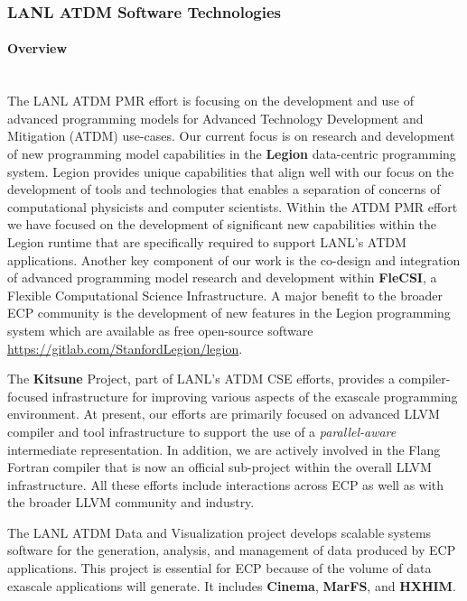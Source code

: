 \subsubsection{ LANL ATDM Software Technologies}

\paragraph{Overview} \leavevmode \\

The LANL ATDM PMR effort is focusing on the development and use of
advanced programming models for Advanced Technology Development and
Mitigation (ATDM) use-cases. Our current focus is on research and development
of new programming model capabilities in the \textbf{Legion} data-centric
programming system. Legion provides unique capabilities that align
well with our focus on the development of tools and technologies that
enables a separation of concerns of computational physicists and
computer scientists. Within the ATDM PMR effort we have focused on the
development of significant new capabilities within the Legion runtime
that are specifically required to support LANL's ATDM
applications. Another key component of our work is the co-design and
integration of advanced programming model research and development
within \textbf{FleCSI}, a Flexible Computational Science Infrastructure. A
major benefit to the broader ECP community is the development of new 
features in the Legion programming system which are available as free
open-source software \url{https://gitlab.com/StanfordLegion/legion}.  

The \textbf{Kitsune} Project, part of LANL's ATDM CSE efforts, provides a
compiler-focused infrastructure for improving various aspects of the
exascale programming environment.  At present, our efforts are primarily
focused on advanced LLVM compiler and tool infrastructure to support the
use of a \emph{parallel-aware} intermediate representation.  In
addition, we are actively involved in the Flang Fortran compiler that
is now an official sub-project within the overall LLVM infrastructure.
All these efforts include interactions across ECP as well as
with the broader LLVM community and industry.  

The LANL ATDM Data and Visualization project develops scalable
systems software for the generation, analysis, and management of data
produced by ECP applications. This project is essential for ECP because
of the volume of data exascale applications will generate. It includes
\textbf{Cinema}, \textbf{MarFS}, and \textbf{HXHIM}.

